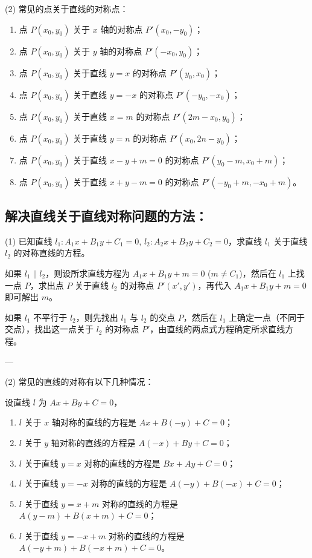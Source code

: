 \documentclass{article}
\begin{document}
(2) 常见的点关于直线的对称点：
\begin{enumerate}
    \item 点 \(P(x_0, y_0)\) 关于 \(x\) 轴的对称点 \(P'(x_0, -y_0)\)；
    \item 点 \(P(x_0, y_0)\) 关于 \(y\) 轴的对称点 \(P'(-x_0, y_0)\)；
    \item 点 \(P(x_0, y_0)\) 关于直线 \(y = x\) 的对称点 \(P'(y_0, x_0)\)；
    \item 点 \(P(x_0, y_0)\) 关于直线 \(y = -x\) 的对称点 \(P'(-y_0, -x_0)\)；
    \item 点 \(P(x_0, y_0)\) 关于直线 \(x = m\) 的对称点 \(P'(2m - x_0, y_0)\)；
    \item 点 \(P(x_0, y_0)\) 关于直线 \(y = n\) 的对称点 \(P'(x_0, 2n - y_0)\)；
    \item 点 \(P(x_0, y_0)\) 关于直线 \(x - y + m = 0\) 的对称点 \(P'(y_0 - m, x_0 + m)\)；
    \item 点 \(P(x_0, y_0)\) 关于直线 \(x + y - m = 0\) 的对称点 \(P'(-y_0 + m, -x_0 + m)\)。
\end{enumerate}

\subsection*{解决直线关于直线对称问题的方法：}
(1) 已知直线 \(l_1: A_1x + B_1y + C_1 = 0\), \(l_2: A_2x + B_2y + C_2 = 0\)，求直线 \(l_1\) 关于直线 \(l_2\) 的对称直线的方程。

如果 \(l_1 \parallel l_2\)，则设所求直线方程为 \(A_1x + B_1y + m = 0\) (\(m \neq C_1\))，然后在 \(l_1\) 上找一点 \(P\)，求出点 \(P\) 关于直线 \(l_2\) 的对称点 \(P'(x', y')\)，再代入 \(A_1x + B_1y + m = 0\) 即可解出 \(m\)。

如果 \(l_1\) 不平行于 \(l_2\)，则先找出 \(l_1\) 与 \(l_2\) 的交点 \(P\)，然后在 \(l_1\) 上确定一点（不同于交点），找出这一点关于 \(l_2\) 的对称点 \(P'\)，由直线的两点式方程确定所求直线方程。

---

(2) 常见的直线的对称有以下几种情况：

设直线 \(l\) 为 \(Ax + By + C = 0\)，
\begin{enumerate}
    \item \(l\) 关于 \(x\) 轴对称的直线的方程是 \(Ax + B(-y) + C = 0\)；
    \item \(l\) 关于 \(y\) 轴对称的直线的方程是 \(A(-x) + By + C = 0\)；
    \item \(l\) 关于直线 \(y = x\) 对称的直线的方程是 \(Bx + Ay + C = 0\)；
    \item \(l\) 关于直线 \(y = -x\) 对称的直线的方程是 \(A(-y) + B(-x) + C = 0\)；
    \item \(l\) 关于直线 \(y = x + m\) 对称的直线的方程是 \(A(y - m) + B(x + m) + C = 0\)；
    \item \(l\) 关于直线 \(y = -x + m\) 对称的直线的方程是 \(A(-y + m) + B(-x + m) + C = 0\)。
\end{enumerate}
\end{document}
